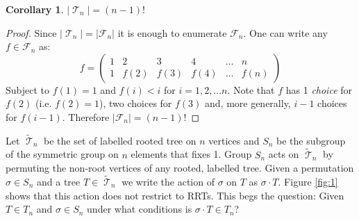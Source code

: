 \documentclass[10pt]{amsart} %
\newtheorem{corol}{Corollary}
\theoremstyle{definition}
\DeclareMathOperator{\T}{\mathcal{T}}
\begin{document}
\begin{corol}
$\lvert \T_n \rvert =  (n-1)!$
\end{corol}
\begin{proof}
 Since $\lvert \T_n \rvert = \lvert \mathcal{F}_n \rvert$ it is enough to enumerate $\mathcal{F}_n$.  One can write any $f \in \mathcal{F}_n$ as:
 \[ f= \left(\begin{array}{cccccc}
     1& 2&3 &4& \dots & n \\
     1 & f(2) &f(3) &f(4) &\dots & f(n)
    \end{array} \right)\]
Subject to  $f(1) = 1$ and $f(i) <i$ for $i = 1,2,\dots n$. Note that $f$ has 1 \emph{choice}  for $f(2)$  (i.e. $f(2) = 1$), two choices for $f(3)$ and, more generally,  $i-1$ choices for $f(i-1)$. Therefore $ \lvert \mathcal{F}_n \rvert = (n-1)!$ 
\end{proof}

Let $\tilde{\T}_n$ be the set of labelled rooted tree on $n$ vertices and $S_n$ be the subgroup of the symmetric group on $n$ elements that fixes 1. Group $S_n$ acts on $\tilde{\T}_n$ by permuting the non-root vertices of any rooted, labelled tree.  Given a permutation $\sigma \in S_n$ and a tree $T \in \tilde{\T}_n$ we write the action of $\sigma$ on $T$ as $\sigma \cdot T$.  Figure \ref{fig:1} shows that this action does not restrict to RRTs.  This begs the question:  Given $T \in T_n$ and $\sigma \in S_n$ under what conditions is $\sigma  \cdot T \in T_n$?
\end{document}
